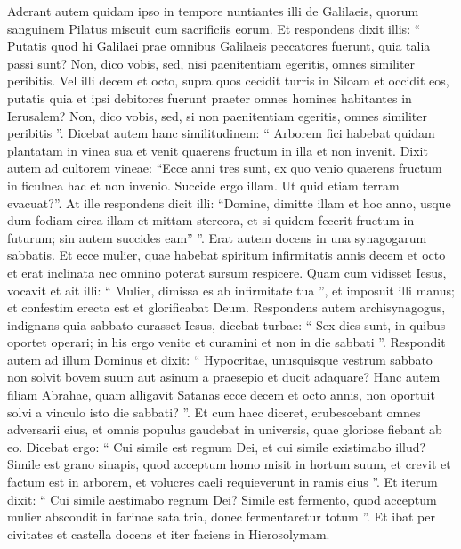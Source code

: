 \begin{biblechapter}
\begin{biblechapter}
\begin{biblechapter}
\begin{biblechapter}
\begin{biblechapter}
\begin{biblechapter}
\begin{biblechapter}
\begin{biblechapter}
\begin{biblechapter}
\begin{biblechapter}
\begin{biblechapter}
\begin{biblechapter}
\begin{biblechapter}
\verse Aderant autem quidam ipso in tempore nuntiantes illi de Galilaeis, quorum sanguinem Pilatus miscuit cum sacrificiis eorum. 
\verse Et respondens dixit illis: “ Putatis quod hi Galilaei prae omnibus Galilaeis peccatores fuerunt, quia talia passi sunt? 
\verse Non, dico vobis, sed, nisi paenitentiam egeritis, omnes similiter peribitis. 
\verse Vel illi decem et octo, supra quos cecidit turris in Siloam et occidit eos, putatis quia et ipsi debitores fuerunt praeter omnes homines habitantes in Ierusalem? 
\verse Non, dico vobis, sed, si non paenitentiam egeritis, omnes similiter peribitis ”.
 \verse Dicebat autem hanc similitudinem: “ Arborem fici habebat quidam plantatam in vinea sua et venit quaerens fructum in illa et non invenit. 
\verse Dixit autem ad cultorem vineae: “Ecce anni tres sunt, ex quo venio quaerens fructum in ficulnea hac et non invenio. Succide ergo illam. Ut quid etiam terram evacuat?”. 
\verse At ille respondens dicit illi: “Domine, dimitte illam et hoc anno, usque dum fodiam circa illam et mittam stercora, 
\verse et si quidem fecerit fructum in futurum; sin autem succides eam” ”.
 \verse Erat autem docens in una synagogarum sabbatis. 
\verse Et ecce mulier, quae habebat spiritum infirmitatis annis decem et octo et erat inclinata nec omnino poterat sursum respicere. 
\verse Quam cum vidisset Iesus, vocavit et ait illi: “ Mulier, dimissa es ab infirmitate tua ”, 
\verse et imposuit illi manus; et confestim erecta est et glorificabat Deum.
 \verse Respondens autem archisynagogus, indignans quia sabbato curasset Iesus, dicebat turbae: “ Sex dies sunt, in quibus oportet operari; in his ergo venite et curamini et non in die sabbati ”. 
\verse Respondit autem ad illum Dominus et dixit: “ Hypocritae, unusquisque vestrum sabbato non solvit bovem suum aut asinum a praesepio et ducit adaquare? 
\verse Hanc autem filiam Abrahae, quam alligavit Satanas ecce decem et octo annis, non oportuit solvi a vinculo isto die sabbati? ”. 
\verse Et cum haec diceret, erubescebant omnes adversarii eius, et omnis populus gaudebat in universis, quae gloriose fiebant ab eo.
 \verse Dicebat ergo: “ Cui simile est regnum Dei, et cui simile existimabo illud? 
\verse Simile est grano sinapis, quod acceptum homo misit in hortum suum, et crevit et factum est in arborem, et volucres caeli requieverunt in ramis eius ”.
 \verse Et iterum dixit: “ Cui simile aestimabo regnum Dei? 
\verse Simile est fermento, quod acceptum mulier abscondit in farinae sata tria, donec fermentaretur totum ”.
 \verse Et ibat per civitates et castella docens et iter faciens in Hierosolymam. 

\end{biblechapter}
\end{biblechapter}
\end{biblechapter}
\end{biblechapter}
\end{biblechapter}
\end{biblechapter}
\end{biblechapter}
\end{biblechapter}
\end{biblechapter}
\end{biblechapter}
\end{biblechapter}
\end{biblechapter}
\end{biblechapter}
